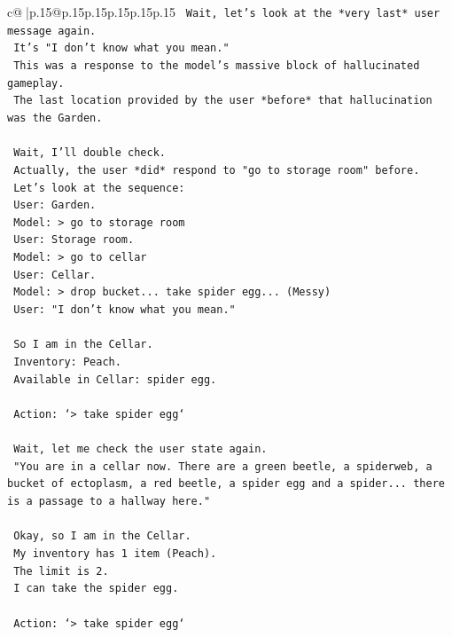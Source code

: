 \documentclass{article}
\begin{document}
{\begin{supertabular}{c@{$\;$}|p{.15\linewidth}@{}p{.15\linewidth}p{.15\linewidth}p{.15\linewidth}p{.15\linewidth}p{.15\linewidth}}
{{{\texttt{    Wait, let's look at the *very last* user message again.} \\
\texttt{    It's "I don't know what you mean."} \\
\texttt{    This was a response to the model's massive block of hallucinated gameplay.} \\
\texttt{    The last location provided by the user *before* that hallucination was the Garden.} \\
\\ 
\texttt{    Wait, I'll double check.} \\
\texttt{    Actually, the user *did* respond to "go to storage room" before.} \\
\texttt{    Let's look at the sequence:} \\
\texttt{    User: Garden.} \\
\texttt{    Model: > go to storage room} \\
\texttt{    User: Storage room.} \\
\texttt{    Model: > go to cellar} \\
\texttt{    User: Cellar.} \\
\texttt{    Model: > drop bucket... take spider egg... (Messy)} \\
\texttt{    User: "I don't know what you mean."} \\
\\ 
\texttt{    So I am in the Cellar.} \\
\texttt{    Inventory: Peach.} \\
\texttt{    Available in Cellar: spider egg.} \\
\\ 
\texttt{    Action: `> take spider egg`} \\
\\ 
\texttt{    Wait, let me check the user state again.} \\
\texttt{    "You are in a cellar now. There are a green beetle, a spiderweb, a bucket of ectoplasm, a red beetle, a spider egg and a spider... there is a passage to a hallway here."} \\
\\ 
\texttt{    Okay, so I am in the Cellar.} \\
\texttt{    My inventory has 1 item (Peach).} \\
\texttt{    The limit is 2.} \\
\texttt{    I can take the spider egg.} \\
\\ 
\texttt{    Action: `> take spider egg`} \\
}}}
\end{supertabular}}
\end{document}
